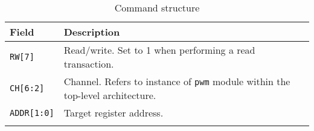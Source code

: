 \documentclass[12pt,a4paper]{article}
\begin{document}
\begin{longtabu} to \textwidth {|X[1]|X[5]|}
\hline
\textbf{Field} & \textbf{Description} \\
\endfirsthead
\hline
\texttt{RW[7]} & Read/write. Set to 1 when performing a read transaction. \\
\hline
\texttt{CH[6:2]} & Channel. Refers to instance of \texttt{pwm} module within the top-level architecture. \\
\hline
\texttt{ADDR[1:0]} & Target register address. \\
\hline
\caption{Command structure}
\end{longtabu}
\end{document}
